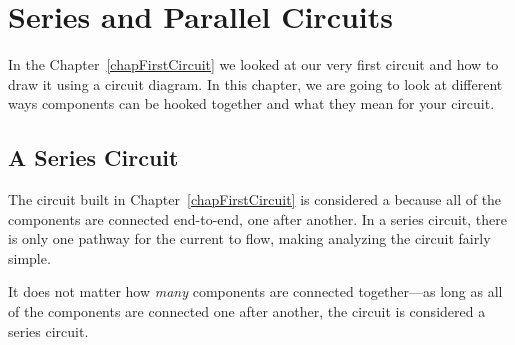 \chapter{Series and Parallel Circuits}

In the Chapter~\ref{chapFirstCircuit} we looked at our very first circuit and how to draw it using a circuit diagram.
In this chapter, we are going to look at different ways components can be hooked together and what they mean for your circuit.

\section{A Series Circuit}

The circuit built in Chapter~\ref{chapFirstCircuit} is considered a  because all of the components are connected end-to-end, one after another.
In a series circuit, there is only one pathway for the current to flow, making analyzing the circuit fairly simple.

It does not matter how \emph{many} components are connected together---as long as all of the components are connected one after another, the circuit is considered a series circuit.
